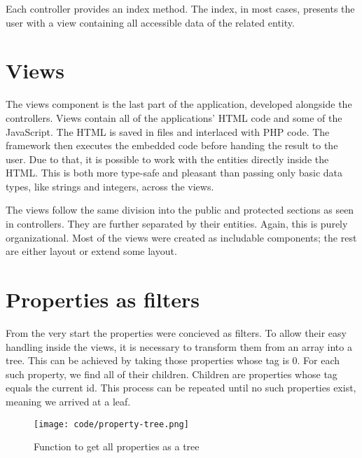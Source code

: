 \documentclass[
  digital,     %
  oneside,     %
  nosansbold,  %
  colorbold, %
  lof,         %
  lot,         %
]{fithesis4}
\begin{document}
Each controller provides an index method. The index, in most cases, presents the user with a view containing all accessible data of the related entity.

\section{Views}

The views component is the last part of the application, developed alongside the controllers. Views contain all of the applications' HTML code and some of the JavaScript. The HTML is saved in  files and interlaced with PHP code. The framework then executes the embedded code before handing the result to the user. Due to that, it is possible to work with the entities directly inside the HTML. This is both more type-safe and pleasant than passing only basic data types, like strings and integers, across the views.

The views follow the same division into the public and protected sections as seen in controllers. They are further separated by their entities. Again, this is purely organizational. Most of the views were created as includable components; the rest are either layout or extend some layout.

\section{Properties as filters}
\label{sect:properties}

From the very start the properties were concieved as filters. To allow their easy handling inside the views, it is necessary to transform them from an array into a tree. This can be achieved by taking those properties whose tag is 0. For each such property, we find all of their children. Children are properties whose tag equals the current id. This process can be repeated until no such properties exist, meaning we arrived at a leaf.

\begin{figure}[!htbp]
	\begin{center}
		\begin{minipage}{.8\textwidth}
			\texttt{[image: code/property-tree.png]}
		\end{minipage}
	\end{center}
	\caption{Function to get all properties as a tree}
	\label{fig:property-tree}
\end{figure}
\end{document}
